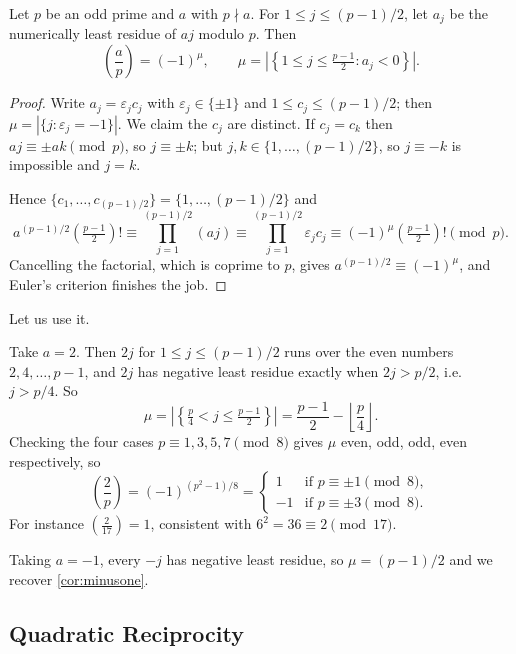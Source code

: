 \documentclass[a4paper]{scrartcl}
\newcommand{\leg}[2]{\left( \frac{#1}{#2} \right)}
\begin{document}
\begin{theorem}\label{nt-thm:gauss}
	Let $p$ be an odd prime and $a$ with $p \nmid a$. For $1 \leq j \leq (p-1)/2$, let $a_j$ be the numerically least residue of $aj$ modulo $p$. Then
	$$
	\leg ap = (-1)^\mu, \qquad \mu = \left|\left\{ 1 \leq j \leq \tfrac{p-1}2 : a_j < 0 \right\}\right|.
	$$
\end{theorem}
\begin{proof}
	Write $a_j = \varepsilon_j c_j$ with $\varepsilon_j \in \{\pm 1\}$ and $1 \leq c_j \leq (p-1)/2$; then $\mu = |\{j : \varepsilon_j = -1\}|$. We claim the $c_j$ are distinct. If $c_j = c_k$ then $aj \equiv \pm ak \pmod p$, so $j \equiv \pm k$; but $j, k \in \{1, \dots, (p-1)/2\}$, so $j \equiv -k$ is impossible and $j = k$.

	Hence $\{c_1, \dots, c_{(p-1)/2}\} = \{1, \dots, (p-1)/2\}$ and
	$$
	a^{(p-1)/2}\left(\tfrac{p-1}2\right)! \equiv \prod_{j=1}^{(p-1)/2}(aj) \equiv \prod_{j=1}^{(p-1)/2}\varepsilon_j c_j \equiv (-1)^\mu \left(\tfrac{p-1}2\right)! \pmod p.
	$$
	Cancelling the factorial, which is coprime to $p$, gives $a^{(p-1)/2} \equiv (-1)^\mu$, and Euler's criterion finishes the job.
\end{proof}

Let us use it.

\begin{example}\label{ex:two}
	Take $a = 2$. Then $2j$ for $1 \leq j \leq (p-1)/2$ runs over the even numbers $2, 4, \dots, p-1$, and $2j$ has negative least residue exactly when $2j > p/2$, i.e.\ $j > p/4$. So
	$$
	\mu = \left|\left\{ \tfrac p4 < j \leq \tfrac{p-1}2 \right\}\right| = \frac{p-1}{2} - \left\lfloor \frac p4 \right\rfloor.
	$$
	Checking the four cases $p \equiv 1, 3, 5, 7 \pmod 8$ gives $\mu$ even, odd, odd, even respectively, so
	$$
	\leg 2p = (-1)^{(p^2 - 1)/8} = \begin{cases}
		1 & \text{if } p \equiv \pm 1 \pmod 8, \\
		-1 & \text{if } p \equiv \pm 3 \pmod 8.
	\end{cases}
	$$
	For instance $\left( \frac2{17} \right) = 1$, consistent with $6^2 = 36 \equiv 2 \pmod{17}$.
\end{example}

\begin{example}
	Taking $a = -1$, every $-j$ has negative least residue, so $\mu = (p-1)/2$ and we recover \autoref{cor:minusone}.
\end{example}

\subsection{Quadratic Reciprocity}
\end{document}
